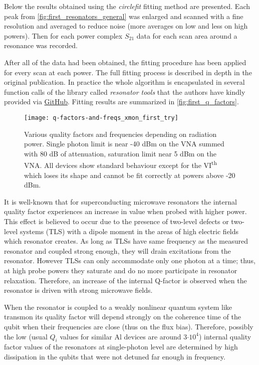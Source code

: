 \documentclass[12pt, twoside]{report}
\numberwithin{equation}{section}
\begin{document}
Below the results obtained using the \textit{circlefit}\cite{probst2015} fitting method are presented. Each peak from \autoref{fig:first_resonators_general} was enlarged and scanned with a fine resolution and averaged to reduce noise (more averages on low and less on high powers). Then for each power complex $S_{21}$ data for each scan area around a resonance was recorded.

After all of the data had been obtained, the fitting procedure has been applied for every scan at each power. The full fitting process is described in depth in the original publication\cite{probst2015}. In practice the whole algorithm is encapsulated in several function calls of the library called \textit{resonator tools} that the authors have kindly provided via \href{https://github.com/sebastianprobst/resonatortools}{GitHub}. Fitting results are summarized in \autoref{fig:first_q_factors}.

\begin{figure}[t]
\centering
\texttt{[image: q-factors-and-freqs\_xmon\_first\_try]}
\caption{Various quality factors and frequencies depending on radiation power. Single photon limit is near -40 dBm on the VNA summed with 80 dB of attenuation, saturation limit near 5 dBm on the VNA. All devices show standard behaviour except for the VI\textsuperscript{th} which loses its shape and cannot be fit correctly at powers above -20 dBm.}
\label{fig:first_q_factors}
\end{figure}

It is well-known\cite{wang2009} that for superconducting microwave resonators the internal quality factor experiences an increase in value when probed with higher power. This effect is believed to occur due to the presence of two-level defects or two-level systems (TLS) with a dipole moment in the areas of high electric fields which resonator creates. As long as TLSs have same frequency as the measured resonator and coupled strong enough, they will drain excitations from the resonator. However TLSs can only accommodate only one photon at a time; thus, at high probe powers they saturate and do no more participate in resonator relaxation. Therefore, an increase of the internal Q-factor is observed when the resonator is driven with strong microwave fields.

When the resonator is coupled to a weakly nonlinear quantum system like transmon its quality factor will depend strongly on the coherence time of the qubit when their frequencies are close (thus on the flux bias). Therefore, possibly the low (usual $Q_i$ values for similar Al devices are around 3$\cdot 10^4$) internal quality factor values of the resonators at single-photon level are determined by high dissipation in the qubits that were not detuned far enough in frequency.
\end{document}
